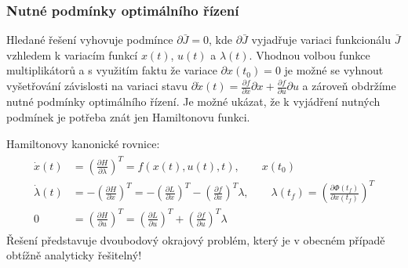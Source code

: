 \subsubsection*{Nutné podmínky optimálního řízení}
Hledané řešení vyhovuje podmínce $ \partial \bar{J} = 0 $, kde $ \partial \bar{J} $ vyjadřuje variaci funkcionálu $ \bar{J} $ vzhledem k variacím funkcí $ x(t) $, $ u(t) $ a $ \lambda(t) $. Vhodnou volbou funkce multiplikátorů a s využitím faktu že variace $ \partial x(t_0) = 0 $ je možné se vyhnout vyšetřování závislosti na variaci stavu $ \partial \dot{x}(t) = \frac{\partial f}{\partial x} \partial x + \frac{\partial f}{\partial u} \partial u $ a zároveň obdržíme nutné podmínky optimálního řízení. Je možné ukázat, že k vyjádření nutných podmínek je potřeba znát jen Hamiltonovu funkci. 

Hamiltonovy kanonické rovnice:
\begin{align*}
\begin{split}
\dot{x}(t) &= \left( \frac{\partial H}{\partial \lambda} \right)^T = f(x(t),u(t),t), \qquad x(t_0) \\
\dot{\lambda}(t) &= - \left( \frac{\partial H}{\partial x} \right)^T = - \left( \frac{\partial L}{\partial x} \right)^T - \left( \frac{\partial f}{\partial x} \right)^T \lambda, \qquad \lambda(t_f) = \left( \frac{\partial \Phi(t_f)}{\partial x(t_f)} \right)^T \\
0 &= \left( \frac{\partial H}{\partial u} \right)^T = \left( \frac{\partial L}{\partial u} \right)^T + \left( \frac{\partial f}{\partial u} \right)^T \lambda
\end{split}
\end{align*}
Řešení představuje dvoubodový okrajový problém, který je v obecném případě obtížně analyticky řešitelný!

